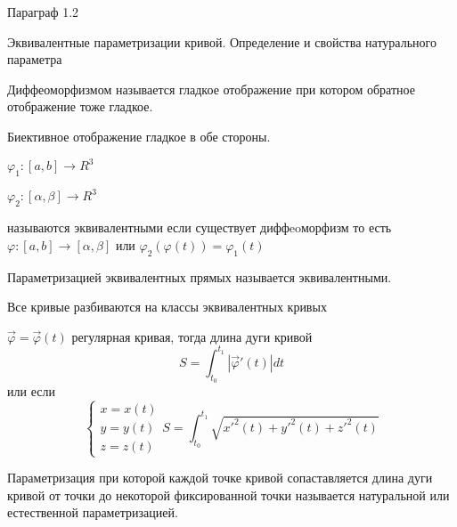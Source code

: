 \begin{title}[\Large]
  Параграф 1.2
\end{title}

\begin{title}[\Large]
  Эквивалентные параметризации кривой. Определение и свойства натурального
  параметра
\end{title}

\begin{define}[диффеоморфизма]
  Диффеоморфизмом называется гладкое отображение при котором обратное
  отображение тоже гладкое.

  Биективное отображение гладкое в обе стороны.
\end{define}

\begin{define}
  $\varphi_1 : [a,b] \to R^3$

  $\varphi_2 : [\alpha, \beta] \to R^3$

  называются эквивалентными если существует диффeoморфизм то есть
  $\varphi : [a,b] \to [\alpha, \beta]$ или $\varphi_2(\varphi(t)) =
  \varphi_1(t)$

  Параметризацией эквивалентных прямых называется эквивалентными.

  Все кривые разбиваются на классы эквивалентных кривых
\end{define}

\begin{block}
  $\vec \varphi = \vec \varphi(t)$ регулярная кривая, тогда длина дуги кривой
  $$
  S = \int_{t_0}^{t_1} | \vec \varphi'(t)| dt
  $$
  или если
  $$
  \left\{
  \begin{array}{c}
    x = x(t) \\
    y = y(t) \\
    z = z(t)
  \end{array}
  \right.
  S = \int_{t_0}^{t_1} \sqrt{ x'^2(t) + y'^2(t) + z'^2(t)}
  $$
\end{block}

\begin{define}
  Параметризация при которой каждой точке кривой сопаставляется длина дуги
  кривой от точки до некоторой фиксированной точки называется натуральной или
  естественной параметризацией.
\end{define}

